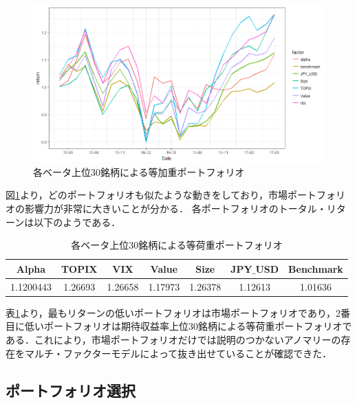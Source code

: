 ﻿\documentclass[a4paper]{jarticle}
\begin{document}
\begin{figure}[H]
	\begin{center}
		\includegraphics[width=15cm]{./fig/factor_top30.png}
		\caption{各ベータ上位30銘柄による等加重ポートフォリオ}
		\label{fig:factor_top30}
	\end{center}
\end{figure}


図\ref{fig:factor_top30}より，どのポートフォリオも似たような動きをしており，市場ポートフォリオの影響力が非常に大きいことが分かる．
各ポートフォリオのトータル・リターンは以下のようである．

\begin{table}[H]
\begin{center}
\begin{tabular}{|c|c|c|c|c|c||c|}
\hline
 Alpha  &    TOPIX   &             VIX      &        Value   &         Size       &        JPY$\_$USD &Benchmark   \\      
\hline
1.1200443 & 1.26693 & 1.26658  &  1.17973 & 1.26378 & 1.12613 & 1.01636\\
\hline
\end{tabular}
\end{center}
\caption{各ベータ上位30銘柄による等荷重ポートフォリオ}
\label{tbl:factor_top30}
\end{table}


表\ref{tbl:factor_top30}より，最もリターンの低いポートフォリオは市場ポートフォリオであり，2番目に低いポートフォリオは期待収益率上位30銘柄による等荷重ポートフォリオである．これにより，市場ポートフォリオだけでは説明のつかないアノマリーの存在をマルチ・ファクターモデルによって抜き出せていることが確認できた．

\subsection{ポートフォリオ選択}
\end{document}
